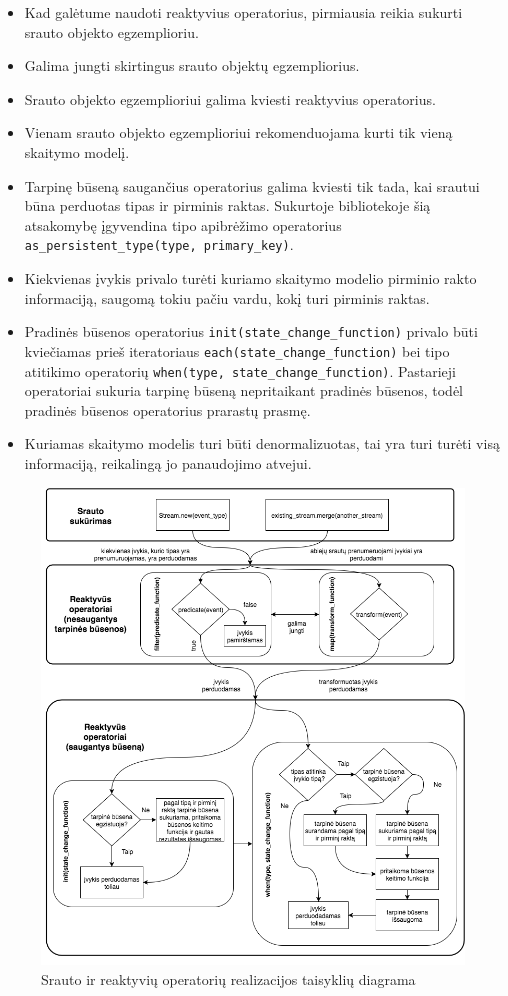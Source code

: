 \begin{itemize}
  \item Kad galėtume naudoti reaktyvius operatorius, pirmiausia reikia sukurti srauto objekto egzemplioriu.
  \item Galima jungti skirtingus srauto objektų egzempliorius.
  \item Srauto objekto egzemplioriui galima kviesti reaktyvius operatorius.
  \item Vienam srauto objekto egzemplioriui rekomenduojama kurti tik vieną skaitymo modelį.
  \item Tarpinę būseną saugančius operatorius galima kviesti tik tada, kai srautui būna perduotas tipas ir pirminis raktas. Sukurtoje bibliotekoje šią atsakomybę įgyvendina tipo apibrėžimo operatorius \lstinline|as_persistent_type(type, primary_key)|.
  \item Kiekvienas įvykis privalo turėti kuriamo skaitymo modelio pirminio rakto informaciją, saugomą tokiu pačiu vardu, kokį turi pirminis raktas.
  \item Pradinės būsenos operatorius \lstinline|init(state_change_function)| privalo būti kviečiamas prieš iteratoriaus \lstinline|each(state_change_function)| bei tipo atitikimo operatorių \lstinline|when(type, state_change_function)|. Pastarieji operatoriai sukuria tarpinę būseną nepritaikant pradinės būsenos, todėl pradinės būsenos operatorius prarastų prasmę.
  \item Kuriamas skaitymo modelis turi būti denormalizuotas, tai yra turi turėti visą informaciją, reikalingą jo panaudojimo atvejui.
\end{itemize}

\begin{figure}[H]
    \centering
    \includegraphics[scale=0.5]{img/cappuccino_rules}
    \caption{Srauto ir reaktyvių operatorių realizacijos taisyklių diagrama}
    \label{img:cappuccino_rules}
\end{figure}

